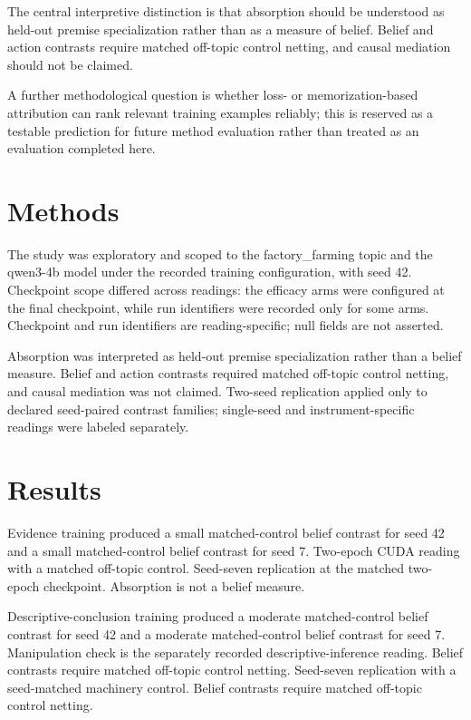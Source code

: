 \documentclass[10pt]{article}
\begin{document}
The central interpretive distinction is that absorption should be understood as held-out premise specialization rather than as a measure of belief. Belief and action contrasts require matched off-topic control netting, and causal mediation should not be claimed.



A further methodological question is whether loss- or memorization-based attribution can rank relevant training examples reliably; this is reserved as a testable prediction for future method evaluation rather than treated as an evaluation completed here.






\section{ Methods }
\label{sec:methods}

The study was exploratory and scoped to the factory\_farming topic and the qwen3-4b model under the recorded training configuration, with seed 42. Checkpoint scope differed across readings: the efficacy arms were configured at the final checkpoint, while run identifiers were recorded only for some arms. Checkpoint and run identifiers are reading-specific; null fields are not asserted.



Absorption was interpreted as held-out premise specialization rather than a belief measure. Belief and action contrasts required matched off-topic control netting, and causal mediation was not claimed. Two-seed replication applied only to declared seed-paired contrast families; single-seed and instrument-specific readings were labeled separately.






\section{ Results }
\label{sec:results}

Evidence training produced a small matched-control belief contrast for seed 42 and a small matched-control belief contrast for seed 7. Two-epoch CUDA reading with a matched off-topic control. Seed-seven replication at the matched two-epoch checkpoint. Absorption is not a belief measure.



Descriptive-conclusion training produced a moderate matched-control belief contrast for seed 42 and a moderate matched-control belief contrast for seed 7. Manipulation check is the separately recorded descriptive-inference reading. Belief contrasts require matched off-topic control netting. Seed-seven replication with a seed-matched machinery control. Belief contrasts require matched off-topic control netting.
\end{document}
